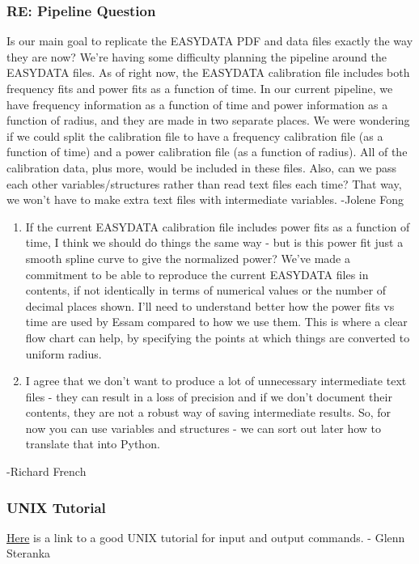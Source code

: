 \documentclass[crop=false,class=book]{standalone}
\begin{document}
\subsubsection{\footnotesize RE: Pipeline Question}
Is our main goal to replicate the EASYDATA PDF and data files exactly the way they are now? We’re having some difficulty planning the pipeline around the EASYDATA files. As of right now, the EASYDATA calibration file includes both frequency fits and power fits as a function of time. In our current pipeline, we have frequency information as a function of time and power information as a function of radius, and they are made in two separate places. We were wondering if we could split the calibration file to have a frequency calibration file (as a function of time) and a power calibration file (as a function of radius). All of the calibration data, plus more, would be included in these files. Also, can we pass each other variables/structures rather than read text files each time? That way, we won’t have to make extra text files with intermediate variables. -Jolene Fong
\begin{enumerate}
    \item If the current EASYDATA calibration file includes power fits as a function of time, I think we should do things the same way - but is this power fit just a smooth spline curve to give the normalized power? We've made a commitment to be able to reproduce the current EASYDATA files in contents, if not identically in terms of numerical values or the number of decimal places shown. I'll need to understand better how the power fits vs time are used by Essam compared to how we use them. This is where a clear flow chart can help, by specifying the points at which things are converted to uniform radius.
    \item I agree that we don't want to produce a lot of unnecessary intermediate text files - they can result in a loss of precision and if we don't document their contents, they are not a robust way of saving intermediate results. So, for now you can use variables and structures - we can sort out later how to translate that into Python.
\end{enumerate}
-Richard French
\subsubsection{\footnotesize UNIX Tutorial}
\href{https://github.com/kennyyu/bootcamp-unix/wiki}{Here} is a link to a good UNIX tutorial for input and output commands. - Glenn Steranka
\end{document}
